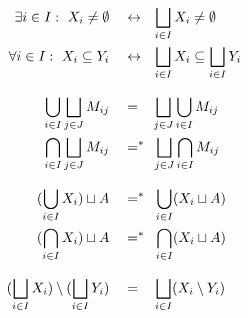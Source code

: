 \begin{align*}
    \exists i\in I:\ X_i\neq\emptyset & \quad\leftrightarrow\quad\hspace{-.24em} \smashoperator[l]{\bigsqcup_{i\in I}} X_i \neq \emptyset \\
    \forall i\in I:\ X_i\subseteq Y_i & \quad\leftrightarrow\quad\hspace{-.24em} \smashoperator[l]{\bigsqcup_{i\in I}} X_i \subseteq \bigsqcup_{i\in I} Y_i \\[0.8em]
    \bigcup_{i \in I} \bigsqcup_{j \in J} M_{ij} & \quad = \quad \smashoperator[l]{\bigsqcup_{j \in J}} \bigcup_{i \in I} M_{ij} \\
    \bigcap_{i \in I} \bigsqcup_{j \in J} M_{ij} & \quad =^* \quad\hspace{-.4em} \smashoperator[l]{\bigsqcup_{j \in J}} \bigcap_{i \in I} M_{ij} \\[0.8em]
    (\bigcup_{i\in I} X_i ) \sqcup A & \quad =^* \quad\hspace{-.4em} \smashoperator[l]{\bigcup_{i\in I}} ( X_i \sqcup A ) \\
    (\bigcap_{i\in I} X_i ) \sqcup A & \quad =^*\quad\hspace{-.4em} \smashoperator[l]{\bigcap_{i\in I}} ( X_i \sqcup A ) \\[0.8em] %
    (\bigsqcup_{i\in I} X_i) \setminus (\bigsqcup_{i\in I} Y_i) & \quad = \quad \smashoperator[l]{\bigsqcup_{i\in I}} (X_i \setminus Y_i)
\end{align*}
\endgroup





